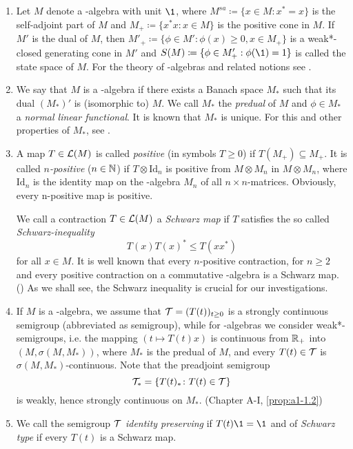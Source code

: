 \begin{enumerate}[1., wide, labelsep=1em, itemindent=\parindent]

\item
Let $ M $ denote a \CA-algebra with unit $ \1 $, where 
%
$
	M^{sa} \coloneqq \{x \in M \colon x^{*} = x\} 
$
%
is the self-adjoint part of $ M $ and 
%
$
	M_{+} \coloneqq \{ x^{*}x \colon x \in M\} 
$
%
is the positive cone in $ M $.
If $ M' $ is the dual of $ M $, then 
%
$
	M'_{+} \coloneqq \{\phi \in M' \colon \phi(x) \geq 0, x \in M_{+}\} 
$
%
is a weak*-closed generating cone in $ M' $ and 
%
$
	S(M) \coloneqq \{\phi \in M'_{+}: \phi(\1) = 1\} 
$
%
is called the state space of $ M $. 
For the theory of \CA-algebras and related notions see \citet{Pedersen:1979}.

\item
We say that $ M $ is a \WA-algebra if there exists a Banach space $ M_{*} $ such that its dual $ (M_{*})' $ is (isomorphic to) $ M $.
We call $ M_{*} $ the \emph{predual} of $ M $ and $ \phi \in M_{*} $ a \emph{normal linear functional}.
It is known that $ M_{*} $ is unique. %
For this and other properties of $M_{*} $, see \citet[Chapter III]{takesaki:1979}.

\item
A map $ T \in \mathcal{L}(M) $ is called \emph{positive} (in symbols $ T \geq 0 $) if $ T(M_{+}) \subseteq M_{+} $.
It is called \emph{$n$-positive} ($ n \in \mathbb{N} $) if $ T \otimes \text{Id}_{n} $ is positive from $ M \otimes M_{n} $ in $ M \otimes M_{n} $, where $ \text{Id}_{n} $ is the identity map on the \CA-algebra $ M_{n} $ of all $ n \times n $-matrices.
Obviously, every n-positive map is positive.

We call a contraction $ T \in \mathcal{L}(M) $ a \emph{Schwarz map} if $ T $ satisfies the so called \emph{Schwarz-inequality}
\[
	T(x)T(x)^{*} \leq T(xx^{*}) 
\]
for all $ x \in M $.
It is well known that every $n$-positive contraction, for $ n \geq 2 $ and every positive contraction on a commutative \CA-algebra is a Schwarz map. (\citet[Chapter IV]{takesaki:1979})
As we shall see, the Schwarz inequality is crucial for our investigations.

\item 
If $ M $ is a \CA-algebra, we assume that $ \mathcal{T} = (T(t))_{t \geq 0} $ is a strongly continuous semigroup (abbreviated as semigroup), while for \WA-algebras we consider weak*-semigroups, i.e. the mapping $ (t \mapsto T(t)x) $ is continuous from $ \mathbb{R}_{+} $ into $ (M,\sigma(M,M_{*}))$, where $ M_{*} $ is the predual of $ M $, and every $ T(t) \in \mathcal{T} $ is $ \sigma(M,M_{*}) $-continuous.
Note that the preadjoint semigroup
\[
	\mathcal{T}_{*} = \{ T(t)_{*} \colon T(t) \in \mathcal{T} \}
\]
is weakly, hence strongly continuous on $ M_{*} $. (Chapter A-I, \ref{prop:a1-1.2})

\item
We call the semigroup $ \mathcal{T} $ \emph{identity preserving} if $ T(t)\1 = \1 $ and of \emph{Schwarz type} if every $ T(t) $ is a Schwarz map.

\end{enumerate}
